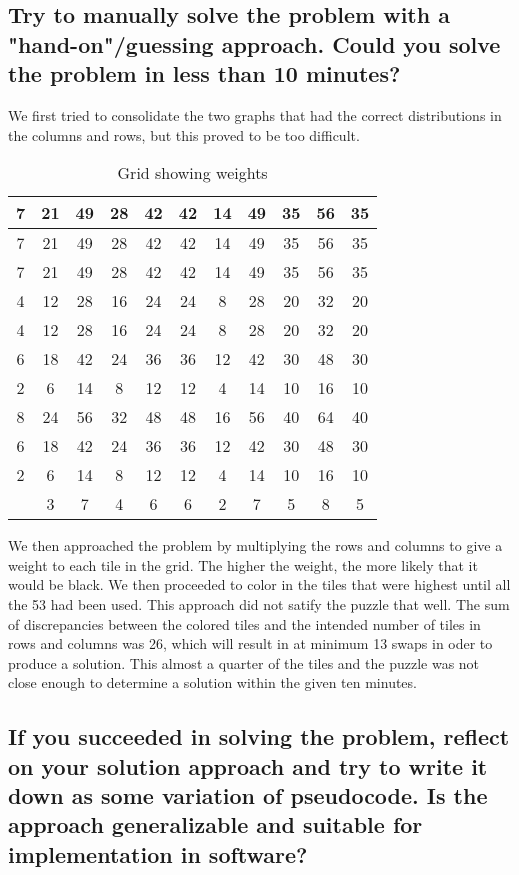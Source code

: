 \documentclass[paper=a4, fontsize=11pt]{scrartcl} %
\numberwithin{figure}{section} %
\numberwithin{table}{section} %
\begin{document}
\subsection{Try to manually solve the problem with a "hand-on"/guessing approach. Could you solve the problem in less than 10 minutes?}
\raggedright
We first tried to consolidate the two graphs that had the correct distributions in the columns and rows, but this proved to be too difficult. 
\FloatBarrier
\begin{table}[!th]
\centering
\begin{tabular}{c||c|c|c|c|c|c|c|c|c|c|}
\hline
7 & 21&  49&  28&  42&  42&  14&  49&  35&  56&  35 \\
\hline
7 & 21&  49&  28&  42&  42&  14&  49&  35&  56&  35 \\
\hline
7 & 21&  49&  28&  42&  42&  14&  49&  35&  56&  35 \\
\hline
4 & 12&  28&  16&  24&  24&   8&  28&  20&  32&  20 \\
\hline
4 & 12&  28&  16&  24&  24&   8&  28&  20&  32&  20 \\
\hline
6 & 18&  42&  24&  36&  36&  12&  42&  30&  48&  30\\
\hline
2  &  6&  14&   8&  12&  12&   4&  14&  10&  16&  10\\
\hline
8  & 24&  56&  32&  48&  48&  16&  56&  40&  64&  40\\
\hline
6  & 18&  42&  24&  36&  36&  12&  42&  30&  48&  30\\
\hline
2 &  6&  14&   8&  12&  12&   4&  14&  10&  16&  10\\
\hline
\hline
&3&7&4&6&6&2&7&5&8&5
\end{tabular}
\caption{Grid showing weights}
\label{ex:table}
\end{table}
\FloatBarrier
We then approached the problem by multiplying the rows and columns to give a weight to each tile in the grid. The higher the weight, the more likely that it would be black. We then proceeded to color in the tiles that were highest until all the 53 had been used. This approach did not satify the puzzle that well. The sum of discrepancies between the colored tiles and the intended number of tiles in rows and columns was 26, which will result in at minimum 13 swaps in oder to produce a solution. This almost a quarter of the tiles and the puzzle was not close enough to determine a solution within the given ten minutes.

\subsection{If you succeeded in solving the problem, reflect on your solution approach and try to write it down as some variation of pseudocode. Is the approach generalizable and suitable for implementation in software?}
\end{document}
